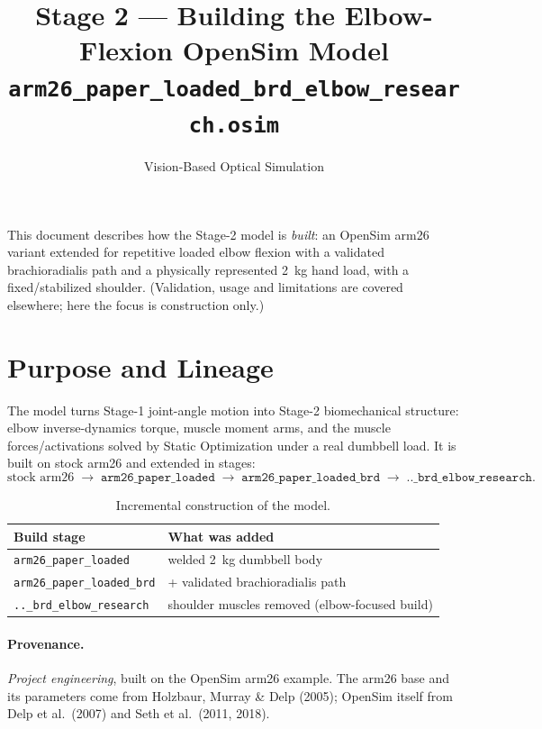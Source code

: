 \documentclass[11pt]{article}
\title{Stage 2 --- Building the Elbow-Flexion OpenSim Model\\[2pt]
\large \texttt{arm26\_paper\_loaded\_brd\_elbow\_research.osim}}
\author{Vision-Based Optical Simulation}
\date{}
\begin{document}
\maketitle

\noindent
This document describes how the Stage-2 model is \emph{built}: an OpenSim arm26
variant extended for repetitive loaded elbow flexion with a validated
brachioradialis path and a physically represented \SI{2}{\kilogram} hand load,
with a fixed/stabilized shoulder. (Validation, usage and limitations are covered
elsewhere; here the focus is construction only.)

\section{Purpose and Lineage}

The model turns Stage-1 joint-angle motion into Stage-2 biomechanical structure:
elbow inverse-dynamics torque, muscle moment arms, and the muscle forces/activations
solved by Static Optimization under a real dumbbell load. It is built on stock
arm26 and extended in stages:
\[
\text{stock arm26}
\;\rightarrow\; \texttt{arm26\_paper\_loaded}
\;\rightarrow\; \texttt{arm26\_paper\_loaded\_brd}
\;\rightarrow\; \texttt{..\_brd\_elbow\_research}.
\]

\begin{table}[h]
\centering
\begin{tabular}{ll}
\toprule
\textbf{Build stage} & \textbf{What was added} \\
\midrule
\texttt{arm26\_paper\_loaded} & welded \SI{2}{\kilogram} dumbbell body \\
\texttt{arm26\_paper\_loaded\_brd} & + validated brachioradialis path \\
\texttt{..\_brd\_elbow\_research} & shoulder muscles removed (elbow-focused build) \\
\bottomrule
\end{tabular}
\caption{Incremental construction of the model.}
\end{table}

\paragraph{Provenance.} \textit{Project engineering}, built on the OpenSim arm26
example. The arm26 base and its parameters come from Holzbaur, Murray \& Delp
(2005); OpenSim itself from Delp et al.\ (2007) and Seth et al.\ (2011, 2018).
\end{document}
